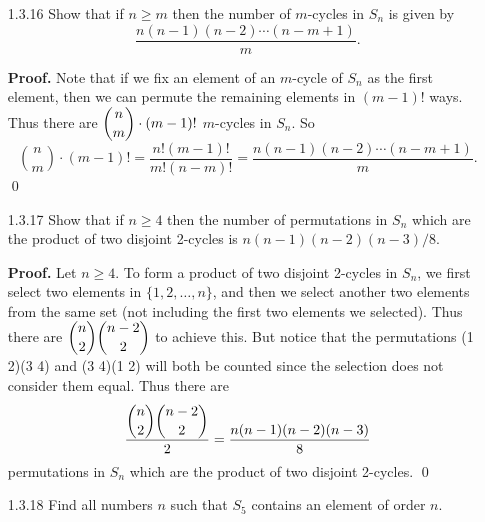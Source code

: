 \begin{enumerate}
      \textbf{Proof.} Let $\sigma \in S_n$. Consider the cycle decomposition of
      $\sigma$, say $\sigma = \sigma_1\cdots\sigma_m$. Let
      $r = \text{lcm}(|\sigma_1|, \ldots, |\sigma_m|)$, so that
      $|\sigma_i| \mid r$ (i.e there exists an integer $k_i$ such that
      $r = k_i \cdot |\sigma_i|$) for all $1 \le i \le m$. We can assume that
      $r > 1$ since the proof is trivial otherwise. Now
      \begin{align*}
         \sigma^r &= (\sigma_1\cdots\sigma_m)^r \\
               &= {\sigma_1}^r\cdots{\sigma_m}^r &[\text{Exercise 1.1.24}] \\
               &= ({\sigma_1}^{|\sigma_1|})^{k_1}\cdots
                  ({\sigma_m}^{|\sigma_m|})^{k_m} \\
               &= 1^{k_1}\cdots1^{k_m} = 1, &[\text{Exercise 1.3.10}]
      \end{align*}
      so that $|\sigma| \le r$. Now consider any positive integer $s < r$. Since
      $s$ is less than the least common multiple of the lengths of the cycles in
      the cycle decomposition of $\sigma$, it follows that $|\sigma| \nmid j$
      for some $1 \le j \le m$, so that ${\sigma_j}^s \neq 1$. Thus
      $\sigma^s \neq 1$, and we can conclude that $|\sigma| = r$. \qed
   \item[1.3.16]  Show that if $n \ge m$ then the number of $m$-cycles in $S_n$
                  is given by
                  $$\frac{n(n - 1)(n - 2) \cdots (n - m + 1)}{m}.$$

      \textbf{Proof.} Note that if we fix an element of an $m$-cycle of $S_n$
      as the first element, then we can permute the remaining elements in
      $(m - 1)!$ ways. Thus there are $\displaystyle\binom{n}{m} \cdot (m - 1)!$ $m$-cycles
      in $S_n$. So
      $$\binom{n}{m} \cdot (m - 1)! = \frac{n!(m - 1)!}{m!(n - m)!} =
        \frac{n(n - 1)(n - 2) \cdots (n - m + 1)}{m}.$$ \qed
   \item[1.3.17]  Show that if $n \ge 4$ then the number of permutations in
                  $S_n$ which are the product of two disjoint 2-cycles is
                  $n(n-1)(n-2)(n-3)/8$.

      \textbf{Proof.} Let $n \ge 4$. To form a product of two disjoint 2-cycles 
      in $S_n$, we first select two elements in $\{1, 2, \ldots, n\}$, and then 
      we select another two elements from the same set (not including the first 
      two elements we selected). Thus there are $\displaystyle\binom{n}{2}\binom{n-2}{2}$ to
      achieve this. But notice that the permutations (1 2)(3 4) and (3 4)(1 2)
      will both be counted since the selection does not consider them equal.
      Thus there are
      $$\frac{\displaystyle\binom{n}{2}\binom{n-2}{2}}{2} = \frac{n(n-1)(n-2)(n-3)}{8}$$
      permutations in $S_n$ which are the product of two disjoint 2-cycles. \qed
   \item[1.3.18]  Find all numbers $n$ such that $S_5$ contains an element of
                  order $n$.


\end{enumerate}

